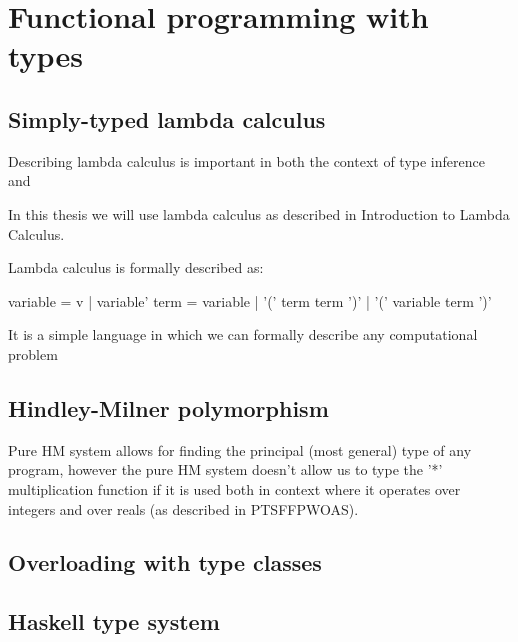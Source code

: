 \chapter{Functional programming with types}


\section{Simply-typed lambda calculus}

Describing lambda calculus is important in both the context of type inference and

In this thesis we will use lambda calculus as described in Introduction to Lambda Calculus.  %

Lambda calculus is formally described as:

variable = v | variable'
term = variable | '(' term term ')' |  '(\lambda' variable term ')'

It is a simple language in which we can formally describe any computational problem


\section{Hindley-Milner polymorphism}

Pure HM system allows for finding the principal (most general) type of any program, however
the pure HM system doesn't allow us to type the '*' multiplication function if it is used both
in context where it operates over integers and over reals (as described in PTSFFPWOAS). %


\section{Overloading with type classes}






\section{Haskell type system}



